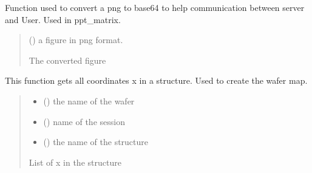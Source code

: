 \documentclass[letterpaper,10pt,english]{sphinxmanual}
\begin{document}
\begin{fulllineitems}
\label{\detokenize{VBD:VBD.fig_to_base64}}
\pysigstartsignatures
{}
\pysigstopsignatures
\sphinxAtStartPar
Function used to convert a png to base64 to help communication between server and User. Used in ppt\_matrix.
\begin{quote}\begin{description}
\sphinxAtStartPar
{} () \textendash{} a figure in png format.

\sphinxAtStartPar
The converted figure

\end{description}\end{quote}

\end{fulllineitems}


\begin{fulllineitems}
\label{\detokenize{VBD:VBD.get_all_x}}
\pysigstartsignatures
{}
\pysigstopsignatures
\sphinxAtStartPar
This function gets all coordinates x in a structure. Used to create the wafer map.
\begin{quote}\begin{description}
\begin{itemize}
\item {} 
\sphinxAtStartPar
{} () \textendash{} the name of the wafer

\item {} 
\sphinxAtStartPar
{} () \textendash{} name of the session

\item {} 
\sphinxAtStartPar
{} () \textendash{} the name of the structure

\end{itemize}

\sphinxAtStartPar
List of x in the structure

\end{description}\end{quote}

\end{fulllineitems}
\end{document}
